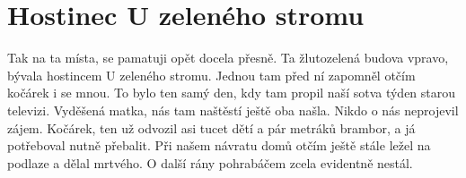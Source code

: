 
\chapter{Hostinec U zeleného stromu}

Tak na ta místa, se pamatuji opět docela přesně. Ta žlutozelená budova
vpravo, bývala hostincem U zeleného stromu. %
Jednou tam před ní zapomněl otčím kočárek i se mnou. To bylo ten samý
den, kdy tam propil naší sotva týden starou televizi. Vyděšená matka,
nás tam naštěstí ještě oba našla. Nikdo o nás neprojevil zájem.
Kočárek, ten už odvozil asi tucet dětí a pár metráků brambor, a já
potřeboval nutně přebalit. Při našem návratu domů otčím ještě stále
ležel na podlaze a dělal mrtvého. O další rány pohrabáčem zcela
evidentně nestál.
